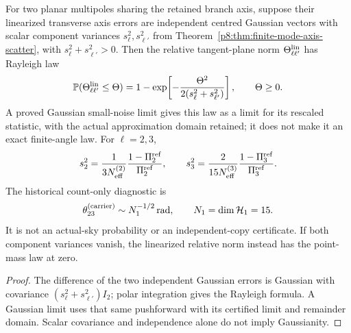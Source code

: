 \documentclass[12pt,a4paper]{article}
\begin{document}
\begin{corollary}
\label{p8:cor:bh-scatter}
For two planar multipoles sharing the retained branch axis, suppose their
linearized transverse axis errors are independent centred Gaussian vectors
with scalar component variances $s_\ell^2,s_{\ell'}^2$ from
Theorem~\ref{p8:thm:finite-mode-axis-scatter}, with
$s_\ell^2+s_{\ell'}^2>0$.  Then the relative tangent-plane
norm $\Theta_{\ell\ell'}^{\rm lin}$ has Rayleigh law
\begin{equation}
\label{p8:eq:finite-relative-axis-law}
 \mathbb P(\Theta_{\ell\ell'}^{\rm lin}\le\Theta)
 =1-\exp\!\left[-\frac{\Theta^2}{2(s_\ell^2+s_{\ell'}^2)}\right],
 \qquad \Theta\ge0.
\end{equation}
A proved Gaussian small-noise limit gives this law as a limit for its
rescaled statistic, with the actual approximation domain retained; it does
not make it an exact finite-angle law.  For $\ell=2,3$,
\begin{equation}
\label{p8:eq:finite-qo-component-variances}
 s_2^2=\frac{1}{3N_{\rm eff}^{(2)}}
       \frac{1-\Pi_2^{\rm ref}}{\Pi_2^{\rm ref}},
 \qquad
 s_3^2=\frac{2}{15N_{\rm eff}^{(3)}}
       \frac{1-\Pi_3^{\rm ref}}{\Pi_3^{\rm ref}}.
\end{equation}
The historical count-only diagnostic is
\begin{equation}
\label{p8:eq:bh-theta23}
 \theta_{23}^{\rm(carrier)}\sim N_1^{-1/2}\,\mathrm{rad},
 \qquad N_1=\dim\mathcal H_1=15.
\end{equation}
It is not an actual-sky probability or an independent-copy certificate.
If both component variances vanish, the linearized relative norm instead has
the point-mass law at zero.
\end{corollary}
\begin{proof}
The difference of the two independent Gaussian errors is Gaussian with
covariance $(s_\ell^2+s_{\ell'}^2)I_2$; polar integration gives the Rayleigh
formula.  A Gaussian limit uses that same pushforward with its certified
limit and remainder domain.  Scalar covariance and independence alone do
not imply Gaussianity.
\end{proof}
\end{document}
